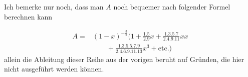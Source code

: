 \par\indent Ich bemerke nur noch, dass man $A$ noch bequemer nach folgender Formel berechnen kann

\[
\begin{aligned}
A={}&(1-x)^{-\frac{3}{2}}\bigl(1+\frac{1\mathord{.}5}{2\mathord{.}9}x+\frac{1\mathord{.}3\mathord{.}5\mathord{.}7}{2\mathord{.}4\mathord{.}9\mathord{.}11}xx\\
&\qquad+\frac{1\mathord{.}3\mathord{.}5\mathord{.}5\mathord{.}7\mathord{.}9}{2\mathord{.}4\mathord{.}6\mathord{.}9\mathord{.}11\mathord{.}13}x^3+\text{etc.}\bigr)
\end{aligned}
\]
\noindent allein die Ableitung dieser Reihe aus der vorigen beruht auf Gründen, die hier nicht ausgeführt werden können.
